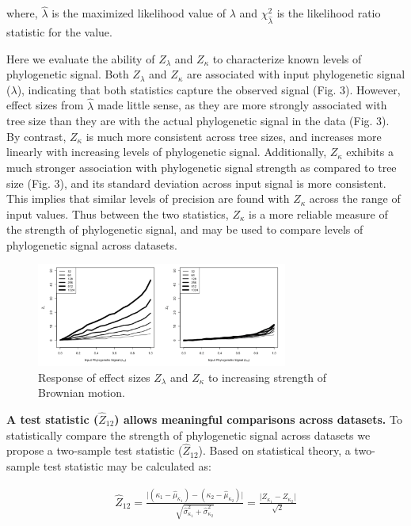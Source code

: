 \documentclass[9pt,twocolumn,twoside,lineno]{pnas-new}
\begin{document}
where, \(\hat{\lambda}\) is the maximized likelihood value of
\(\lambda\) and \(\chi^{2}_{\hat{\lambda}}\) is the likelihood ratio
statistic for the value.

Here we evaluate the ability of \(Z_{\lambda}\) and \(Z_{\kappa}\) to
characterize known levels of phylogenetic signal. Both \(Z_{\lambda}\)
and \(Z_{\kappa}\) are associated with input phylogenetic signal
(\(\lambda\)), indicating that both statistics capture the observed
signal (Fig. 3). However, effect sizes from \(\hat{\lambda}\) made
little sense, as they are more strongly associated with tree size than
they are with the actual phylogenetic signal in the data (Fig. 3). By
contrast, \(Z_{\kappa}\) is much more consistent across tree sizes, and
increases more linearly with increasing levels of phylogenetic signal.
Additionally, \(Z_{\kappa}\) exhibits a much stronger association with
phylogenetic signal strength as compared to tree size (Fig. 3), and its
standard deviation across input signal is more consistent. This implies
that similar levels of precision are found with \(Z_{\kappa}\) across
the range of input values. Thus between the two statistics,
\(Z_{\kappa}\) is a more reliable measure of the strength of
phylogenetic signal, and may be used to compare levels of phylogenetic
signal across datasets.

\begin{figure}
\centering
\includegraphics[width=8.25cm]{fig.3.png}
\caption{Response of effect sizes \(Z_{\lambda}\) and \(Z_{\kappa}\) to increasing strength of Brownian motion.{}}
\end{figure}

\textbf{A test statistic (\(\hat{Z}_{12}\)) allows meaningful
comparisons across datasets.} To statistically compare the strength of
phylogenetic signal across datasets we propose a two-sample test
statistic (\(\hat{Z}_{12}\)). Based on statistical theory, a two-sample
test statistic may be calculated as:

\begin{align}
  \hat{Z}_{12}=\frac{\lvert{(\kappa_{1}-\hat\mu_{\kappa_1})-(\kappa_{2}-\hat\mu_{\kappa_2})}\rvert}{\sqrt{\hat\sigma^2_{\kappa_1}+\hat\sigma^2_{\kappa_2}}} = \frac{\lvert Z_{\kappa_1} - Z_{\kappa_2}\rvert}{\sqrt{2}}
\end{align}
\end{document}
